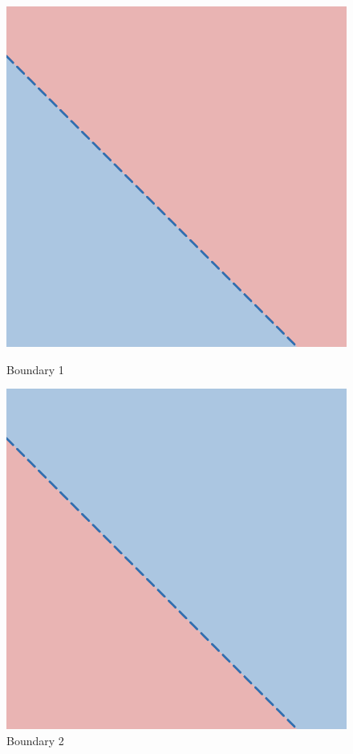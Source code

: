 \begin{figure}[H]
    \centering
    \begin{minipage}{0.45\textwidth}
        \centering
        \includegraphics[width=\textwidth]{images/boundaries/linear1.png}
        \caption{Boundary 1}
        \label{fig:linear1}
    \end{minipage}
    \hfill
    \begin{minipage}{0.45\textwidth}
        \centering
        \includegraphics[width=\textwidth]{images/boundaries/linear2.png}
        \caption{Boundary 2}
        \label{fig:linear2}
    \end{minipage}
    

\end{figure}
